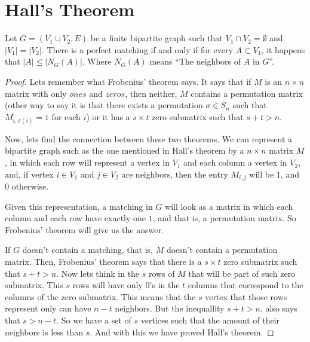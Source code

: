 ﻿\chapter{Hall's Theorem}

    \begin{theorem}
        Let $G = (V_1 \cup V_2, E)$ be a finite bipartite graph such that $V_1 \cap V_2 = \emptyset$ and $\left|V_1\right| = \left|V_2\right|$.
        There is a perfect matching if and only if for every $A \subset V_1$, it happens that $\left|A\right| \leq \left|N_G(A)\right|$. Where
        $N_G(A)$ means ``The neighbors of $A$ in $G$''.
    \end{theorem}
    
    \begin{proof}
        Lets remember what Frobenius' theorem says. It says that if $M$ is an $n \times n$ matrix with only $ones$ and $zeros$, then neither,
        $M$ contains a permutation matrix (other way to say it is that there exists a permutation $\sigma \in S_n$ such that $M_{i, \sigma(i)} = 1$ 
        for each $i$) or it has a $s \times t$ zero submatrix such that $s + t > n$.\pn
        
        Now, lets find the connection between these two theorems. We can represent a bipartite graph such as the one mentioned in Hall's theorem by 
        a $n \times n$ matrix $M$, in which each row will represent a vertex in $V_1$ and each column a vertex in $V_2$, and, if vertex $i \in V_1$ and 
        $j \in V_2$ are neighbors, then the entry $M_{i,j}$ will be $1$, and $0$ otherwise.\pn
        
        Given this representation, a matching in $G$ will look as a matrix in which each column and each row have exactly one $1$, and that is,
        a permutation matrix. So Frobenius' theorem will give us the answer.\pn
        
        If $G$ doesn't contain a matching, that is, $M$ doesn't contain a permutation matrix. Then, Frobenius' theorem says that there is 
        a $s \times t$ zero submatrix such that $s + t > n$. Now lets think in the $s$ rows of $M$ that will be part of such zero submatrix.
        This $s$ rows will have only $0$'s in the $t$ columns that correspond to the columns of the zero submatrix. This means that the $s$ vertex that
        those rows represent only can have $n - t$ neighbors. But the inequallity $s + t > n$, also says that $s > n - t$. So we have a
        set of $s$ vertices such that the amount of their neighbors is less than $s$. And with this we have proved Hall's theorem.        
    \end{proof}